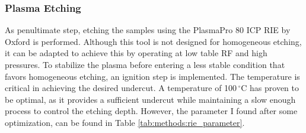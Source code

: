     \subsubsection*{Plasma Etching}
        As penultimate step, etching the samples using the PlasmaPro 80 ICP RIE by Oxford is performed. Although this tool is not designed for homogeneous etching, it can be adapted to achieve this by operating at low table RF and high pressures. To stabilize the plasma before entering a less stable condition that favors homogeneous etching, an ignition step is implemented. The temperature is critical in achieving the desired undercut. A temperature of 100\,$^\circ$C has proven to be optimal, as it provides a sufficient undercut while maintaining a slow enough process to control the etching depth. However, the parameter I found after some optimization, can be found in Table \ref{tab:methods:rie_parameter}.
